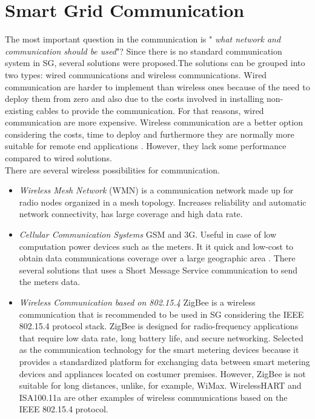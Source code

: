 \section{Smart Grid Communication}
The most important question in the communication is "\textit{ what network and communication should be used}"\cite{journals/comsur/FangMXY12}? Since there is no standard communication system in SG, several solutions were proposed.The solutions can be grouped into two types: wired communications and wireless communications. Wired communication are harder to implement than wireless ones because of the need to deploy them from zero and also due to the costs involved in installing non-existing cables to provide the communication. For that reasons, wired communication are more expensive.  Wireless communication are a better option considering the costs, time to deploy and furthermore they are normally more suitable for remote end applications \cite{parikh2010opportunities}. However, they lack some performance compared to wired solutions.\\
There are several wireless possibilities for communication.\\
\begin{itemize}
  \item \textit{Wireless Mesh Network} (WMN) is a communication network made up for radio nodes organized in a mesh topology\cite{journals/comsur/FangMXY12}. Increases reliability and automatic network connectivity, has large coverage and high data rate.
\item \textit{Cellular Communication Systems}  GSM and 3G. Useful in case of low computation power devices such as the meters. It it quick and low-cost to obtain data communications coverage over a large geographic area \cite{akyol2010survey}. There several solutions that uses a Short Message Service communication to send the meters data.
\item \textit{Wireless Communication based on 802.15.4} ZigBee is a wireless communication that is recommended to be used in SG considering the IEEE 802.15.4 protocol stack\cite{parikh2010opportunities}. ZigBee is designed for radio-frequency applications that require low data rate, long battery life, and secure networking. Selected as the communication technology for the smart metering devices\cite{farhangi2010path} because it provides a standardized platform for exchanging data between smart metering devices and appliances located on costumer  premises\cite{journals/comsur/FangMXY12}. However, ZigBee is not suitable for long distances, unlike, for example, WiMax. WirelessHART and ISA100.11a are other examples of wireless communications based on the IEEE 802.15.4 protocol.
\end{itemize}
